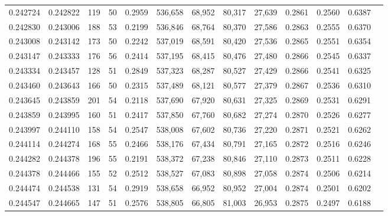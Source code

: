 \begin{tabular}{rrrrrrrrrrrrr}
0.242724 & 0.242822 &   119 &  50 &                                     0.2959 & 536,658 &  68,952 &  80,317 &  27,639 & 0.2861 & 0.2560 & 0.6387 \\
0.242830 & 0.243006 &   188 &  53 &                                     0.2199 & 536,846 &  68,764 &  80,370 &  27,586 & 0.2863 & 0.2555 & 0.6370 \\
0.243008 & 0.243142 &   173 &  50 &                                     0.2242 & 537,019 &  68,591 &  80,420 &  27,536 & 0.2865 & 0.2551 & 0.6354 \\
0.243147 & 0.243333 &   176 &  56 &                                     0.2414 & 537,195 &  68,415 &  80,476 &  27,480 & 0.2866 & 0.2545 & 0.6337 \\
0.243334 & 0.243457 &   128 &  51 &                                     0.2849 & 537,323 &  68,287 &  80,527 &  27,429 & 0.2866 & 0.2541 & 0.6325 \\
0.243460 & 0.243643 &   166 &  50 &                                     0.2315 & 537,489 &  68,121 &  80,577 &  27,379 & 0.2867 & 0.2536 & 0.6310 \\
0.243645 & 0.243859 &   201 &  54 &                                     0.2118 & 537,690 &  67,920 &  80,631 &  27,325 & 0.2869 & 0.2531 & 0.6291 \\
0.243859 & 0.243995 &   160 &  51 &                                     0.2417 & 537,850 &  67,760 &  80,682 &  27,274 & 0.2870 & 0.2526 & 0.6277 \\
0.243997 & 0.244110 &   158 &  54 &                                     0.2547 & 538,008 &  67,602 &  80,736 &  27,220 & 0.2871 & 0.2521 & 0.6262 \\
0.244114 & 0.244274 &   168 &  55 &                                     0.2466 & 538,176 &  67,434 &  80,791 &  27,165 & 0.2872 & 0.2516 & 0.6246 \\
0.244282 & 0.244378 &   196 &  55 &                                     0.2191 & 538,372 &  67,238 &  80,846 &  27,110 & 0.2873 & 0.2511 & 0.6228 \\
0.244378 & 0.244466 &   155 &  52 &                                     0.2512 & 538,527 &  67,083 &  80,898 &  27,058 & 0.2874 & 0.2506 & 0.6214 \\
0.244474 & 0.244538 &   131 &  54 &                                     0.2919 & 538,658 &  66,952 &  80,952 &  27,004 & 0.2874 & 0.2501 & 0.6202 \\
0.244547 & 0.244665 &   147 &  51 &                                     0.2576 & 538,805 &  66,805 &  81,003 &  26,953 & 0.2875 & 0.2497 & 0.6188 \\

\end{tabular}
